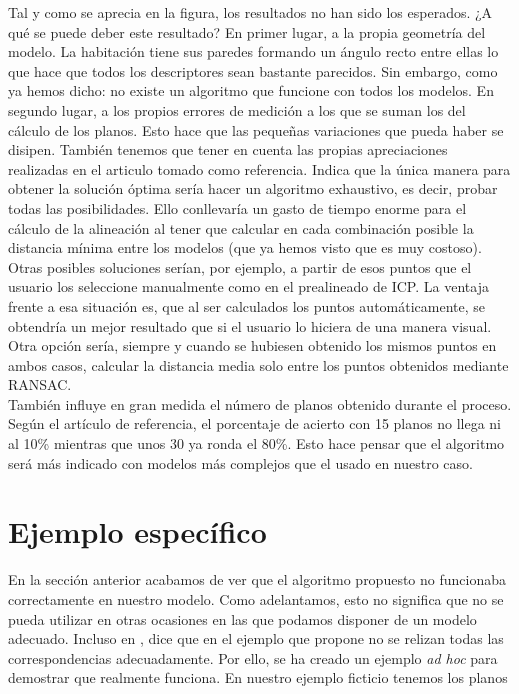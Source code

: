 Tal y como se aprecia en la figura, los resultados no han sido los esperados. ¿A qué se puede deber este resultado? En primer lugar, a la propia geometría del modelo. La habitación tiene sus paredes formando un ángulo recto entre ellas lo que hace que todos los descriptores sean bastante parecidos. Sin embargo, como ya hemos dicho: no existe un algoritmo que funcione con todos los modelos. En segundo lugar, a los propios errores de medición a los que se suman los del cálculo de los planos. Esto hace que las pequeñas variaciones que pueda haber se disipen. También tenemos que tener en cuenta las propias apreciaciones realizadas en el articulo tomado como referencia. Indica que la única manera para obtener la solución óptima sería hacer un algoritmo exhaustivo, es decir, probar todas las posibilidades. Ello conllevaría un gasto de tiempo enorme para el cálculo de la alineación al tener que calcular en cada combinación posible la distancia mínima entre los modelos (que ya hemos visto que es muy costoso). Otras posibles soluciones serían, por ejemplo, a partir de esos puntos que el usuario los seleccione manualmente como en el prealineado de ICP. La ventaja frente a esa situación es, que al ser calculados los puntos automáticamente, se obtendría un mejor resultado que si el usuario lo hiciera de una manera visual. Otra opción sería, siempre y cuando se hubiesen obtenido los mismos puntos en ambos casos, calcular la distancia media solo entre los puntos obtenidos mediante RANSAC. \\

También influye en gran medida el número de planos obtenido durante el proceso. Según el artículo de referencia, el porcentaje de acierto con 15 planos no llega ni al 10\% mientras que unos 30 ya ronda el 80\%. Esto hace pensar que el algoritmo será más indicado con modelos más complejos que el usado en nuestro caso.

\section{Ejemplo específico}
En la sección anterior acabamos de ver que el algoritmo propuesto no funcionaba correctamente en nuestro modelo. Como adelantamos, esto no significa que no se pueda utilizar en otras ocasiones en las que podamos disponer de un modelo adecuado. Incluso en \cite{theiler2012automatic}, dice que en el ejemplo que propone no se relizan todas las correspondencias adecuadamente. Por ello, se ha creado un ejemplo \textit{ad hoc} para demostrar que realmente funciona. En nuestro ejemplo ficticio tenemos los planos

